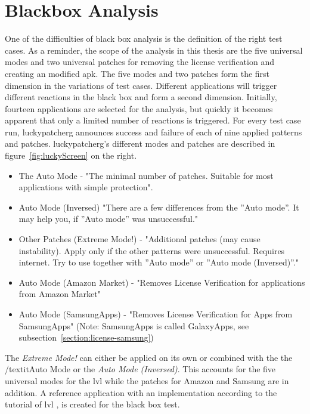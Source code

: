 \section{Blackbox Analysis} \label{section:luckypatcher-blackbox}
One of the difficulties of black box analysis is the definition of the right test cases.
As a reminder, the scope of the analysis in this thesis are the five universal modes and two universal patches for removing the license verification and creating an modified \gls{apk}.
The five modes and two patches form the first dimension in the variations of test cases.
Different applications will trigger different reactions in the black box and form a second dimension.
\newline
Initially, fourteen applications are selected for the analysis, but quickly it becomes apparent that only a limited number of reactions is triggered.
For every test case run, \gls{luckypatcherg} announces success and failure of each of nine applied patterns and patches.
\newline
\gls{luckypatcherg}’s different modes and patches are described in figure~\ref{fig:luckyScreen} on the right.
\begin{itemize}
\item The Auto Mode - "The minimal number of patches. Suitable for most applications with simple protection".
\item Auto Mode (Inversed) "There are a few differences from the ”Auto mode”. It may help you, if ”Auto mode” was unsuccessful."
\item Other Patches (Extreme Mode!) - "Additional patches (may cause instability). Apply only if the other patterns were unsuccessful. Requires internet. Try to use together with ”Auto mode” or ”Auto mode (Inversed)”."
\item Auto Mode (Amazon Market) - "Removes License Verification for applications from Amazon Market"
\item Auto Mode (SamsungApps) - "Removes License Verification for Apps from SamsungApps" (Note: SamsungApps is called GalaxyApps, see subsection~\ref{section:license-samsung})
\end{itemize}
The \textit{Extreme Mode!} can either be applied on its own or combined with the the /textit{Auto Mode} or the \textit{Auto Mode (Inversed)}.
This accounts for the five universal modes for the \gls{lvl} while the patches for Amazon and Samsung are in addition.
\newline
A reference application with an implementation according to the tutorial of \gls{lvl} \cite{developersLicensingAdding}, is created for the black box test.

